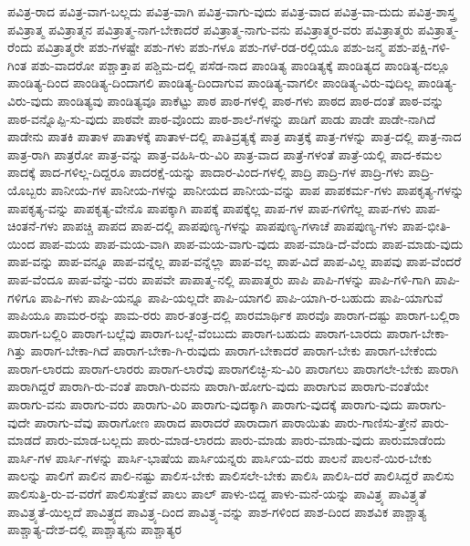 {ಪವಿತ್ರ-ರಾದ
ಪವಿತ್ರ-ವಾಗ-ಬಲ್ಲದು
ಪವಿತ್ರ-ವಾಗಿ
ಪವಿತ್ರ-ವಾಗು-ವುದು
ಪವಿತ್ರ-ವಾದ
ಪವಿತ್ರ-ವಾ-ದುದು
ಪವಿತ್ರ-ಶಾಸ್ತ್ರ
ಪವಿತ್ರಾತ್ಮ
ಪವಿತ್ರಾತ್ಮನ
ಪವಿತ್ರಾತ್ಮ-ನಾಗ-ಬೇಕಾದರೆ
ಪವಿತ್ರಾತ್ಮ-ನಾಗು-ವನು
ಪವಿತ್ರಾತ್ಮರ-ವರು
ಪವಿತ್ರಾತ್ಮರು
ಪವಿತ್ರಾತ್ಮ-ರೆಂದು
ಪವಿತ್ರಾತ್ಮರೇ
ಪಶು-ಗಳಷ್ಟೇ
ಪಶು-ಗಳು
ಪಶು-ಗಳೂ
ಪಶು-ಗಳೆ-ರಡ-ರಲ್ಲಿಯೂ
ಪಶು-ಜನ್ಮ
ಪಶು-ಪಕ್ಷಿ-ಗಳಿ-ಗಿಂತ
ಪಶು-ವಾದರೋ
ಪಶ್ಚಾತ್ತಾಪ
ಪಶ್ಚಿಮ-ದಲ್ಲಿ
ಪಸೆಡ-ನಾದ
ಪಾಂಡಿತ್ಯ
ಪಾಂಡಿತ್ಯಕ್ಕೆ
ಪಾಂಡಿತ್ಯದ
ಪಾಂಡಿತ್ಯ-ದಲ್ಲೂ
ಪಾಂಡಿತ್ಯ-ದಿಂದ
ಪಾಂಡಿತ್ಯ-ದಿಂದಾಗಲಿ
ಪಾಂಡಿತ್ಯ-ದಿಂದಾಗುವ
ಪಾಂಡಿತ್ಯ-ವಾಗಲೀ
ಪಾಂಡಿತ್ಯ-ವಿರು-ವುದಿಲ್ಲ
ಪಾಂಡಿತ್ಯ-ವಿರು-ವುದು
ಪಾಂಡಿತ್ಯವು
ಪಾಂಡಿತ್ಯವೂ
ಪಾಕೆಟ್ಟು
ಪಾಠ
ಪಾಠ-ಗಳಲ್ಲಿ
ಪಾಠ-ಗಳು
ಪಾಠದ
ಪಾಠ-ದಂತೆ
ಪಾಠ-ವನ್ನು
ಪಾಠ-ವನ್ನೊಪ್ಪಿ-ಸು-ವುದು
ಪಾಠವೇ
ಪಾಠ-ವೊಂದು
ಪಾಠ-ಶಾಲೆ-ಗಳನ್ನು
ಪಾಡಿಗೆ
ಪಾಡು
ಪಾಡೇ
ಪಾಡೇ-ನಾಗಿದೆ
ಪಾಡೇನು
ಪಾತಕಿ
ಪಾತಾಳ
ಪಾತಾಳಕ್ಕೆ
ಪಾತಾಳ-ದಲ್ಲಿ
ಪಾತಿವ್ರತ್ಯಕ್ಕೆ
ಪಾತ್ರ
ಪಾತ್ರಕ್ಕೆ
ಪಾತ್ರ-ಗಳನ್ನು
ಪಾತ್ರ-ದಲ್ಲಿ
ಪಾತ್ರ-ನಾದ
ಪಾತ್ರ-ರಾಗಿ
ಪಾತ್ರರೋ
ಪಾತ್ರ-ವನ್ನು
ಪಾತ್ರ-ವಹಿಸಿ-ರು-ವಿರಿ
ಪಾತ್ರ-ವಾದ
ಪಾತ್ರೆ-ಗಳಂತೆ
ಪಾತ್ರೆ-ಯಲ್ಲಿ
ಪಾದ-ಕಮಲ
ಪಾದಕ್ಕೆ
ಪಾದ-ಗಳಿಲ್ಲ-ದಿದ್ದರೂ
ಪಾದರಕ್ಷೆ-ಯನ್ನು
ಪಾದಾರ-ವಿಂದ-ಗಳಲ್ಲಿ
ಪಾದ್ರಿ
ಪಾದ್ರಿ-ಗಳ
ಪಾದ್ರಿ-ಗಳು
ಪಾದ್ರಿ-ಯೊಬ್ಬರು
ಪಾನೀಯ-ಗಳ
ಪಾನೀಯ-ಗಳನ್ನು
ಪಾನೀಯದ
ಪಾನೀಯ-ವನ್ನು
ಪಾಪ
ಪಾಪಕರ್ಮ-ಗಳು
ಪಾಪಕೃತ್ಯ-ಗಳನ್ನು
ಪಾಪಕೃತ್ಯ-ವನ್ನು
ಪಾಪಕೃತ್ಯ-ವೇನೊ
ಪಾಪಕ್ಕಾಗಿ
ಪಾಪಕ್ಕೆ
ಪಾಪಕ್ಕೆಲ್ಲ
ಪಾಪ-ಗಳ
ಪಾಪ-ಗಳಿಗೆಲ್ಲ
ಪಾಪ-ಗಳು
ಪಾಪ-ಚಿಂತನೆ-ಗಳು
ಪಾಪಚ್ಚಿ
ಪಾಪದ
ಪಾಪ-ದಲ್ಲಿ
ಪಾಪಪುಣ್ಯ-ಗಳನ್ನು
ಪಾಪಪುಣ್ಯ-ಗಳಾಚೆ
ಪಾಪಪುಣ್ಯ-ಗಳು
ಪಾಪ-ಭೀತಿ-ಯಿಂದ
ಪಾಪ-ಮಯ
ಪಾಪ-ಮಯ-ವಾಗಿ
ಪಾಪ-ಮಯ-ವಾಗು-ವುದು
ಪಾಪ-ಮಾಡಿ-ದೆ-ವೆಂದು
ಪಾಪ-ಮಾಡು-ವುದು
ಪಾಪ-ವನ್ನು
ಪಾಪ-ವನ್ನೂ
ಪಾಪ-ವನ್ನೆಲ್ಲ
ಪಾಪ-ವನ್ನೆಲ್ಲಾ
ಪಾಪ-ವಲ್ಲ
ಪಾಪ-ವಿದೆ
ಪಾಪ-ವಿಲ್ಲ
ಪಾಪವು
ಪಾಪ-ವೆಂದರೆ
ಪಾಪ-ವೆಂದೂ
ಪಾಪ-ವೆನ್ನು-ವರು
ಪಾಪವೇ
ಪಾಪಾತ್ಮ-ನಲ್ಲಿ
ಪಾಪಾತ್ಮರು
ಪಾಪಿ
ಪಾಪಿ-ಗಳನ್ನು
ಪಾಪಿ-ಗಳಿ-ಗಾಗಿ
ಪಾಪಿ-ಗಳಿಗೂ
ಪಾಪಿ-ಗಳು
ಪಾಪಿ-ಯನ್ನೂ
ಪಾಪಿ-ಯಲ್ಲದೇ
ಪಾಪಿ-ಯಾಗಲಿ
ಪಾಪಿ-ಯಾಗಿ-ರ-ಬಹುದು
ಪಾಪಿ-ಯಾಗುವೆ
ಪಾಪಿಯೂ
ಪಾಮರ-ರನ್ನು
ಪಾಮ-ರರು
ಪಾರ-ತಂತ್ರ-ದಲ್ಲಿ
ಪಾರಮಾರ್ಥಿಕ
ಪಾರವೊ
ಪಾರಾಗ-ದಷ್ಟು
ಪಾರಾಗ-ಬಲ್ಲಿರಾ
ಪಾರಾಗ-ಬಲ್ಲಿರಿ
ಪಾರಾಗ-ಬಲ್ಲೆವು
ಪಾರಾಗ-ಬಲ್ಲೆ-ವೆಂಬುದು
ಪಾರಾಗ-ಬಹುದು
ಪಾರಾಗ-ಬಾರದು
ಪಾರಾಗ-ಬೇಕಾ-ಗಿತ್ತು
ಪಾರಾಗ-ಬೇಕಾ-ಗಿದೆ
ಪಾರಾಗ-ಬೇಕಾ-ಗಿ-ರುವುದು
ಪಾರಾಗ-ಬೇಕಾದರೆ
ಪಾರಾಗ-ಬೇಕು
ಪಾರಾಗ-ಬೇಕೆಂದು
ಪಾರಾಗ-ಲಾರದು
ಪಾರಾಗ-ಲಾರರು
ಪಾರಾಗ-ಲಾರೆವು
ಪಾರಾಗಲಿಚ್ಛಿ-ಸು-ವಿರಿ
ಪಾರಾಗಲು
ಪಾರಾಗಲೇ-ಬೇಕು
ಪಾರಾಗಿ
ಪಾರಾಗಿದ್ದರೆ
ಪಾರಾಗಿ-ರು-ವಂತೆ
ಪಾರಾಗಿ-ರುವನು
ಪಾರಾಗಿ-ಹೋಗು-ವುದು
ಪಾರಾಗುವ
ಪಾರಾಗು-ವಂತೆಯೇ
ಪಾರಾಗು-ವನು
ಪಾರಾಗು-ವರು
ಪಾರಾಗು-ವಿರಿ
ಪಾರಾಗು-ವುದಕ್ಕಾಗಿ
ಪಾರಾಗು-ವುದಕ್ಕೆ
ಪಾರಾಗು-ವುದು
ಪಾರಾಗು-ವುದೇ
ಪಾರಾಗು-ವೆವು
ಪಾರಾಗೋಣ
ಪಾರಾದ
ಪಾರಾದರೆ
ಪಾರಾದಾಗ
ಪಾರಾಯಿತು
ಪಾರು-ಗಾಣಿಸು-ತ್ತೇನೆ
ಪಾರು-ಮಾಡದೆ
ಪಾರು-ಮಾಡ-ಬಲ್ಲದು
ಪಾರು-ಮಾಡ-ಲಾರದು
ಪಾರು-ಮಾಡು
ಪಾರು-ಮಾಡು-ವುದು
ಪಾರುಮಾಡೆಂದು
ಪಾರ್ಸಿ-ಗಳ
ಪಾರ್ಸಿ-ಗಳನ್ನು
ಪಾರ್ಸಿ-ಭಾಷೆಯ
ಪಾರ್ಸಿಯನ್ನರು
ಪಾರ್ಸಿಯ-ವರು
ಪಾಲನೆ
ಪಾಲನೆ-ಯಿರ-ಬೇಕು
ಪಾಲನ್ನು
ಪಾಲಿಗೆ
ಪಾಲಿನ
ಪಾಲಿ-ನಷ್ಟು
ಪಾಲಿಸ-ಬೇಕು
ಪಾಲಿಸಲೇ-ಬೇಕು
ಪಾಲಿಸಿ
ಪಾಲಿಸಿ-ದರೆ
ಪಾಲಿಸಿದ್ದರೆ
ಪಾಲಿಸು
ಪಾಲಿಸುತ್ತಿ-ರು-ವ-ವರೆಗೆ
ಪಾಲಿಸುತ್ತೇವೆ
ಪಾಲು
ಪಾಲ್
ಪಾಳು-ಬಿದ್ದ
ಪಾಳು-ಮನೆ-ಯನ್ನು
ಪಾವಿತ್ರ್ಯ
ಪಾವಿತ್ರ್ಯತೆ
ಪಾವಿತ್ರ್ಯತೆ-ಯಿಲ್ಲದೆ
ಪಾವಿತ್ರ್ಯದ
ಪಾವಿತ್ರ್ಯ-ದಿಂದ
ಪಾವಿತ್ರ್ಯ-ವನ್ನು
ಪಾಶ-ಗಳಿಂದ
ಪಾಶ-ದಿಂದ
ಪಾಶವಿಕ
ಪಾಶ್ಚಾತ್ಯ
ಪಾಶ್ಚಾತ್ಯ-ದೇಶ-ದಲ್ಲಿ
ಪಾಶ್ಚಾತ್ಯನು
ಪಾಶ್ಚಾತ್ಯರ
}
